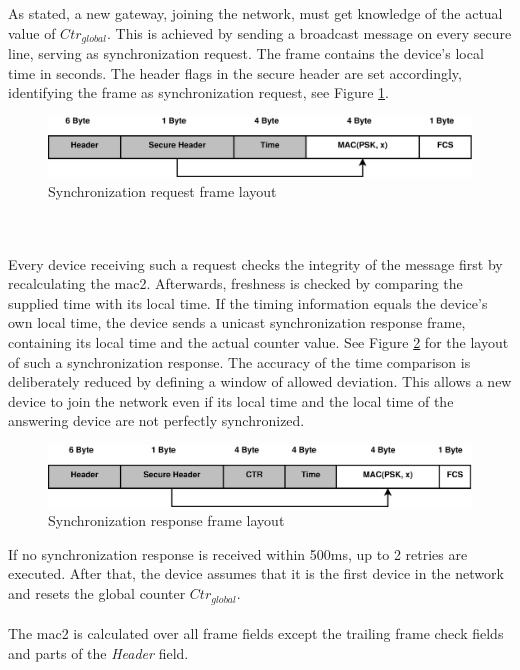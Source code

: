 As stated, a new gateway, joining the network, must get knowledge of the actual value of $Ctr_{global}$. This is achieved by sending a broadcast message on
every secure line, 
serving as synchronization request. The frame  contains the device's local time in seconds. The header flags in the secure header are set accordingly, identifying
the frame as synchronization request, see Figure \ref{fig:syncReqFormat}.
\begin{figure}
  \centering
    \includegraphics[width=1\textwidth]{figures/formatSyncReq.eps}
 \caption{Synchronization request frame layout}
 \label{fig:syncReqFormat}
\end{figure}
\\
\\
Every device receiving such a request checks the integrity of the message first by recalculating the \gls{mac2}. Afterwards, freshness is checked by comparing
the supplied time with its local time. If the timing information equals the device's own local time, the device sends a unicast synchronization response
frame, containing its local time and the actual counter value. See Figure \ref{fig:syncResFormat} for the layout of such a synchronization response.
The accuracy of the time comparison is deliberately reduced by defining
a window of allowed deviation. This allows a new device to join the network even if its local time and the local time of the answering device are not 
perfectly synchronized.
\begin{figure}
  \centering
    \includegraphics[width=1\textwidth]{figures/formatSyncRes.eps}
 \caption{Synchronization response frame layout}
 \label{fig:syncResFormat}
\end{figure}
If no synchronization response is received within 500ms, up to 2 retries are executed. After that, the device assumes that it is the first device in the
network and resets the global counter $Ctr_{global}$.
\\
\\
The \gls{mac2} is calculated over all frame fields except the trailing frame check fields and parts of the \textit{Header} field. 

